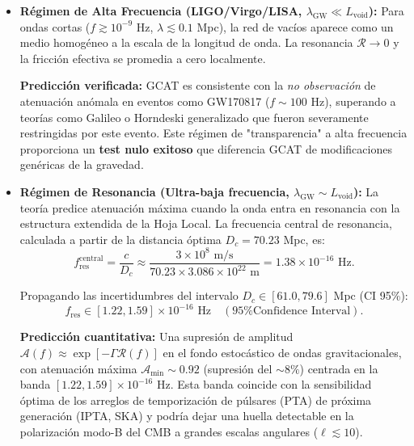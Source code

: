 \documentclass[12pt, a4paper]{article}
\theoremstyle{plain}
\theoremstyle{definition}
\begin{document}
\begin{itemize}
    \item \textbf{Régimen de Alta Frecuencia (LIGO/Virgo/LISA, $\lambda_{\text{GW}} \ll L_{\text{void}}$):} Para ondas cortas ($f \gtrsim 10^{-9}$ Hz, $\lambda \lesssim 0.1$ Mpc), la red de vacíos aparece como un medio homogéneo a la escala de la longitud de onda. La resonancia $\mathcal{R} \to 0$ y la fricción efectiva se promedia a cero localmente. 
    
    \textbf{Predicción verificada:} GCAT es consistente con la \textit{no observación} de atenuación anómala en eventos como GW170817 ($f \sim 100$ Hz), superando a teorías como Galileo o Horndeski generalizado que fueron severamente restringidas por este evento. Este régimen de "transparencia" a alta frecuencia proporciona un \textbf{test nulo exitoso} que diferencia GCAT de modificaciones genéricas de la gravedad.
    
    \item \textbf{Régimen de Resonancia (Ultra-baja frecuencia, $\lambda_{\text{GW}} \sim L_{\text{void}}$):} La teoría predice atenuación máxima cuando la onda entra en resonancia con la estructura extendida de la Hoja Local. La frecuencia central de resonancia, calculada a partir de la distancia óptima $D_c = 70.23$ Mpc, es:
    \begin{equation}
    f_{\text{res}}^{\text{central}} = \frac{c}{D_c} \approx \frac{3\times 10^8 \text{ m/s}}{70.23 \times 3.086\times 10^{22} \text{ m}} = 1.38 \times 10^{-16} \text{ Hz}.
    \label{eq:gw_frequency}
    \end{equation}
    
    Propagando las incertidumbres del intervalo $D_c \in [61.0, 79.6]$ Mpc (CI 95\%):
    \begin{equation}
    f_{\text{res}} \in [1.22, 1.59] \times 10^{-16} \text{ Hz} \quad (\text{95\% Confidence Interval}).
    \label{eq:gw_frequency_ci}
    \end{equation}
    
    \textbf{Predicción cuantitativa:} Una supresión de amplitud $\mathcal{A}(f) \approx \exp[-\Gamma \mathcal{R}(f)]$ en el fondo estocástico de ondas gravitacionales, con atenuación máxima $\mathcal{A}_{\min} \sim 0.92$ (supresión del $\sim 8\%$) centrada en la banda $[1.22, 1.59] \times 10^{-16}$ Hz. Esta banda coincide con la sensibilidad óptima de los arreglos de temporización de púlsares (PTA) de próxima generación (IPTA, SKA) y podría dejar una huella detectable en la polarización modo-B del CMB a grandes escalas angulares ($\ell \lesssim 10$).
    

\end{itemize}
\end{document}
